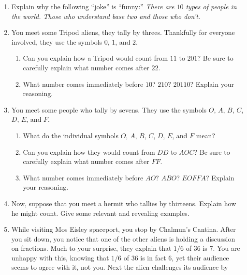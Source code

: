 \begin{problems}
\begin{enumerate}
\item Explain why the following ``joke'' is ``funny:'' \textit{There
  are $10$ types of people in the world. Those who understand base two
  and those who don't.}
\item You meet some Tripod aliens, they tally by threes. Thankfully
  for everyone involved, they use the symbols $0$, $1$, and $2$. 
\begin{enumerate}
\item Can you explain how a Tripod would count from $11$ to $201$? Be
  sure to carefully explain what number comes after $22$.
\item What number comes immediately before $10$?  $210$? $20110$?
  Explain your reasoning.
\end{enumerate}
\item You meet some people who tally by sevens. They use the symbols
  $O$, $A$, $B$, $C$, $D$, $E$, and $F$. 
\begin{enumerate}
\item What do the individual symbols $O$, $A$, $B$, $C$, $D$, $E$, and
  $F$ mean?
\item Can you explain how they would count from $DD$ to $AOC$? Be sure
  to carefully explain what number comes after $FF$.
\item What number comes immediately before $AO$?  $ABO$? $EOFFA$?
  Explain your reasoning.
\end{enumerate}
\item Now, suppose that you meet a hermit who tallies by
  thirteens. Explain how he might count. Give some relevant and
  revealing examples.
\item While visiting Mos Eisley spaceport, you stop by Chalmun's
  Cantina. After you sit down, you notice that one of the other aliens
  is holding a discussion on fractions. Much to your surprise, they
  explain that $1/6$ of $36$ is $7$. You are unhappy with this,
  knowing that $1/6$ of $36$ is in fact $6$, yet their audience seems
  to agree with it, not you. Next the alien challenges its audience by

\end{enumerate}
\end{problems}
